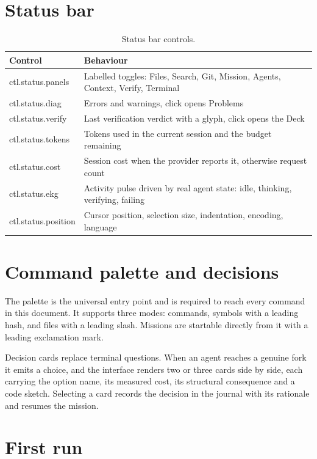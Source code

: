 \section{Status bar}

\begin{table}[h]
\centering
\small
\begin{tabularx}{\textwidth}{l X}
\toprule
\textbf{Control} & \textbf{Behaviour} \\
\midrule
ctl.status.panels & Labelled toggles: Files, Search, Git, Mission, Agents, Context, Verify, Terminal \\
ctl.status.diag & Errors and warnings, click opens Problems \\
ctl.status.verify & Last verification verdict with a glyph, click opens the Deck \\
ctl.status.tokens & Tokens used in the current session and the budget remaining \\
ctl.status.cost & Session cost when the provider reports it, otherwise request count \\
ctl.status.ekg & Activity pulse driven by real agent state: idle, thinking, verifying, failing \\
ctl.status.position & Cursor position, selection size, indentation, encoding, language \\
\bottomrule
\end{tabularx}
\caption{Status bar controls.}
\end{table}

\section{Command palette and decisions}

The palette is the universal entry point and is required to reach every command in this
document. It supports three modes: commands, symbols with a leading hash, and files with a
leading slash. Missions are startable directly from it with a leading exclamation mark.

Decision cards replace terminal questions. When an agent reaches a genuine fork it emits a
choice, and the interface renders two or three cards side by side, each carrying the option
name, its measured cost, its structural consequence and a code sketch. Selecting a card
records the decision in the journal with its rationale and resumes the mission.

\section{First run}

